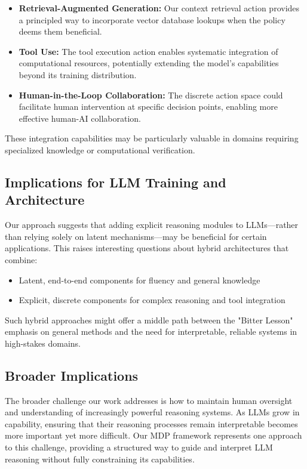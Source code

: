 \documentclass[10pt,journal,compsoc]{IEEEtran}
\begin{document}
\begin{itemize}
\item \textbf{Retrieval-Augmented Generation:} Our context retrieval action provides a principled way to incorporate vector database lookups when the policy deems them beneficial.

\item \textbf{Tool Use:} The tool execution action enables systematic integration of computational resources, potentially extending the model's capabilities beyond its training distribution.

\item \textbf{Human-in-the-Loop Collaboration:} The discrete action space could facilitate human intervention at specific decision points, enabling more effective human-AI collaboration.
\end{itemize}

These integration capabilities may be particularly valuable in domains requiring specialized knowledge or computational verification.

\subsection{Implications for LLM Training and Architecture}

Our approach suggests that adding explicit reasoning modules to LLMs—rather than relying solely on latent mechanisms—may be beneficial for certain applications. This raises interesting questions about hybrid architectures that combine:

\begin{itemize}
\item Latent, end-to-end components for fluency and general knowledge
\item Explicit, discrete components for complex reasoning and tool integration
\end{itemize}

Such hybrid approaches might offer a middle path between the "Bitter Lesson" emphasis on general methods and the need for interpretable, reliable systems in high-stakes domains.

\subsection{Broader Implications}

The broader challenge our work addresses is how to maintain human oversight and understanding of increasingly powerful reasoning systems. As LLMs grow in capability, ensuring that their reasoning processes remain interpretable becomes more important yet more difficult. Our MDP framework represents one approach to this challenge, providing a structured way to guide and interpret LLM reasoning without fully constraining its capabilities.
\end{document}
